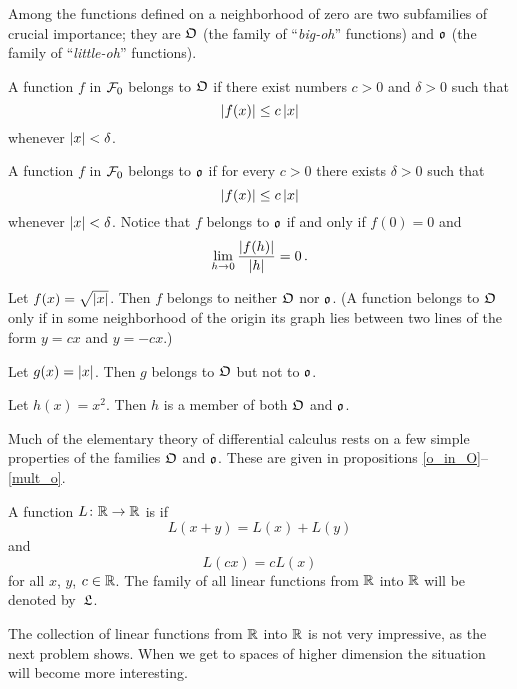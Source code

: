 Among the functions defined on a neighborhood of zero are two subfamilies of crucial
importance; they are $\mathfrak{O}$ (the family of ``\emph{big-oh}'' functions) and $\mathfrak{o}$ (the
family of ``\emph{little-oh}'' functions).

\begin{defn} A function $f$ in $\mathcal{F}_0$ belongs to
$\mathfrak{O}$ if there exist numbers $c > 0$ and $\delta > 0$ such that
   \[ \lvert f(x)\rvert \le c\,\lvert x\rvert \]
whenever $\lvert x\rvert < \delta$.

A function $f$ in $\mathcal{F}_0$ belongs to
$\mathfrak{o}$ if for every $c > 0$ there exists $\delta > 0$ such that
   \[ \lvert f(x)\rvert \le c\,\lvert x\rvert \]
whenever $\lvert x\rvert < \delta$. Notice that $f$ belongs to $\mathfrak{o}$ if and only if $f(0) = 0$
and
   \[ \lim_{h \rightarrow 0}\frac{\lvert f(h)\rvert}{\lvert h\rvert} = 0\,. \]
\end{defn}

\begin{exam}  Let $f(x) = \sqrt{\lvert x\rvert}$. Then $f$ belongs to neither $\mathfrak{O}$ nor $\mathfrak{o}$.
(A function belongs to $\mathfrak{O}$ only if in some neighborhood of the origin its graph lies
between two lines of the form $y = cx$ and $y = -cx$.)
\end{exam}

\begin{exam}  Let $g(x) = \lvert x\rvert$. Then $g$ belongs to $\mathfrak{O}$ but not to $\mathfrak{o}$.
\end{exam}

\begin{exam}  Let $h(x) = x^2$. Then $h$ is a member of both $\mathfrak{O}$ and $\mathfrak{o}$.
\end{exam}

Much of the elementary theory of differential calculus rests on a few simple properties of the
families $\mathfrak{O}$ and $\mathfrak{o}$. These are given in propositions \ref{o_in_O}--\ref{mult_o}.

\begin{defn} A function $L \colon \mathbb{R} \rightarrow \mathbb{R}$ is
 if
   \[ L(x + y) = L(x) + L(y) \]
and
   \[ L(cx) = cL(x) \]
for all $x$, $y$, $c \in \mathbb{R}$.  The family of all linear functions from $\mathbb{R}$ into $\mathbb{R}$ will be
denoted
by~$\mathfrak{L}$.
\end{defn}

The collection of linear functions from $\mathbb{R}$ into $\mathbb{R}$ is not very impressive, as the next
problem shows.  When we get to spaces of higher dimension the situation will become more
interesting.

